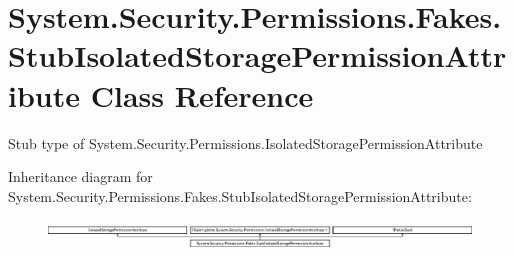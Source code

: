 \hypertarget{class_system_1_1_security_1_1_permissions_1_1_fakes_1_1_stub_isolated_storage_permission_attribute}{\section{System.\-Security.\-Permissions.\-Fakes.\-Stub\-Isolated\-Storage\-Permission\-Attribute Class Reference}
\label{class_system_1_1_security_1_1_permissions_1_1_fakes_1_1_stub_isolated_storage_permission_attribute}
}


Stub type of System.\-Security.\-Permissions.\-Isolated\-Storage\-Permission\-Attribute 


Inheritance diagram for System.\-Security.\-Permissions.\-Fakes.\-Stub\-Isolated\-Storage\-Permission\-Attribute\-:\begin{figure}[H]
\begin{center}
\leavevmode
\includegraphics[height=0.792640cm]{class_system_1_1_security_1_1_permissions_1_1_fakes_1_1_stub_isolated_storage_permission_attribute}
\end{center}
\end{figure}
